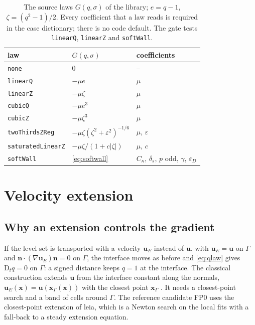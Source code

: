 \documentclass[preprint,3p,11pt]{elsarticle}
\newcommand{\nhat}{\mathbf{n}}
\newcommand{\bu}{\mathbf{u}}
\newcommand{\bx}{\mathbf{x}}
\newcommand{\Dt}{\mathrm{D}_t}
\begin{document}
\begin{table}[t]
  \centering
  \caption{The source laws $G(q,\sigma)$ of the library; $e=q-1$,
  $\zeta=(q^2-1)/2$. Every coefficient that a law reads is required in the case
  dictionary; there is no code default. The gate tests \texttt{linearQ},
  \texttt{linearZ} and \texttt{softWall}.}
  \label{tab:laws}
  \begin{tabular}{lll}
    \toprule
    law & $G(q,\sigma)$ & coefficients\\
    \midrule
    \texttt{none}             & $0$ & --\\
    \texttt{linearQ}          & $-\mu e$ & $\mu$\\
    \texttt{linearZ}          & $-\mu\zeta$ & $\mu$\\
    \texttt{cubicQ}           & $-\mu e^3$ & $\mu$\\
    \texttt{cubicZ}           & $-\mu\zeta^3$ & $\mu$\\
    \texttt{twoThirdsZReg}    & $-\mu\zeta(\zeta^2+\varepsilon^2)^{-1/6}$ & $\mu$, $\varepsilon$\\
    \texttt{saturatedLinearZ} & $-\mu\zeta/(1+c\lvert\zeta\rvert)$ & $\mu$, $c$\\
    \texttt{softWall}         & \eqref{eq:softwall} &
                                 $C_\kappa$, $\delta_s$, $p$ odd, $\gamma$, $\varepsilon_D$\\
    \bottomrule
  \end{tabular}
\end{table}

\section{Velocity extension}
\label{sec:extension}

\subsection{Why an extension controls the gradient}
If the level set is transported with a velocity $\bu_E$ instead of $\bu$, with
$\bu_E=\bu$ on $\Gamma$ and $\nhat\cdot(\nabla\bu_E)\nhat=0$ on $\Gamma$, the interface
moves as before and \eqref{eq:qlaw} gives $\Dt q=0$ on $\Gamma$: a signed distance
keeps $q=1$ at the interface. The classical construction extends $\bu$ from the
interface constant along the normals, $\bu_E(\bx)=\bu(\bx_\Gamma(\bx))$ with the
closest point $\bx_\Gamma$ \cite{AdalsteinssonSethian1999}. It needs a closest-point
search and a band of cells around $\Gamma$. The reference candidate FP0 uses the
closest-point extension of leia, which is a Newton search on the local fits with a
fall-back to a steady extension equation.
\end{document}
